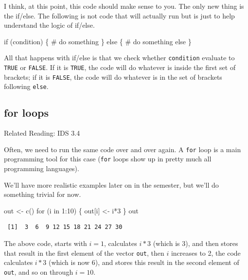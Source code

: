 \documentclass[
  letterpaper,
  DIV=11,
  numbers=noendperiod]{scrreprt}
\newenvironment{Shaded}{\begin{snugshade}}{\end{snugshade}}
\newcommand{\CommentTok}[1]{\textcolor[rgb]{0.37,0.37,0.37}{#1}}
\newcommand{\ControlFlowTok}[1]{\textcolor[rgb]{0.00,0.23,0.31}{#1}}
\newcommand{\DecValTok}[1]{\textcolor[rgb]{0.68,0.00,0.00}{#1}}
\newcommand{\FunctionTok}[1]{\textcolor[rgb]{0.28,0.35,0.67}{#1}}
\newcommand{\NormalTok}[1]{\textcolor[rgb]{0.00,0.23,0.31}{#1}}
\newcommand{\OtherTok}[1]{\textcolor[rgb]{0.00,0.23,0.31}{#1}}
\newcommand{\SpecialCharTok}[1]{\textcolor[rgb]{0.37,0.37,0.37}{#1}}
\begin{document}
I think, at this point, this code should make sense to you. The only new
thing is the if/else. The following is not code that will actually run
but is just to help understand the logic of if/else.

\begin{Shaded}
\begin{Highlighting}[]
\ControlFlowTok{if}\NormalTok{ (condition) \{}
  \CommentTok{\# do something}
\NormalTok{\} }\ControlFlowTok{else}\NormalTok{ \{}
  \CommentTok{\# do something else}
\NormalTok{\}}
\end{Highlighting}
\end{Shaded}

All that happens with if/else is that we check whether
\texttt{condition} evaluate to \texttt{TRUE} or \texttt{FALSE}. If it is
\texttt{TRUE}, the code will do whatever is inside the first set of
brackets; if it is \texttt{FALSE}, the code will do whatever is in the
set of brackets following \texttt{else}.

\subsection{for loops}\label{for-loops}

Related Reading: IDS 3.4

Often, we need to run the same code over and over again. A \texttt{for}
loop is a main programming tool for this case (\texttt{for} loops show
up in pretty much all programming languages).

We'll have more realistic examples later on in the semester, but we'll
do something trivial for now.

\begin{Shaded}
\begin{Highlighting}[]
\NormalTok{out }\OtherTok{\textless{}{-}} \FunctionTok{c}\NormalTok{()}
\ControlFlowTok{for}\NormalTok{ (i }\ControlFlowTok{in} \DecValTok{1}\SpecialCharTok{:}\DecValTok{10}\NormalTok{) \{}
\NormalTok{  out[i] }\OtherTok{\textless{}{-}}\NormalTok{ i}\SpecialCharTok{*}\DecValTok{3}
\NormalTok{\}}
\NormalTok{out}
\end{Highlighting}
\end{Shaded}

\begin{verbatim}
 [1]  3  6  9 12 15 18 21 24 27 30
\end{verbatim}

The above code, starts with \(i=1\), calculates \(i*3\) (which is 3),
and then stores that result in the first element of the vector
\texttt{out}, then \(i\) increases to 2, the code calculates \(i*3\)
(which is now 6), and stores this result in the second element of
\texttt{out}, and so on through \(i=10\).
\end{document}
